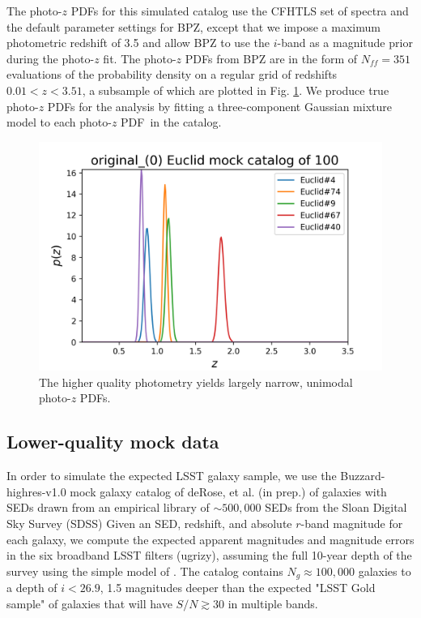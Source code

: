 \documentclass[\docopts]{\docclass}
\newcommand{\pz}{photo-$z$ PDF}
\begin{document}
The \pz s for this simulated catalog use the CFHTLS set of spectra
\citep{ilbert_accurate_2006} and the default parameter settings for BPZ, except
that we impose a maximum photometric redshift of 3.5 and allow BPZ to use the
$i$-band as a magnitude prior during the photo-$z$ fit. The \pz s from BPZ are
in the form of $N_{ff} = 351$ evaluations of the probability density on a
regular grid of redshifts $0.01 < z < 3.51$, a subsample of which are plotted
in Fig. \ref{fig:euclid_pzs}.  We produce true \pz s for the analysis by
fitting a three-component Gaussian mixture model to each \pz\ in the catalog.

\begin{figure}
  \includegraphics[width=0.9\columnwidth]{figures/euclid_pzs.png}
  \caption{The higher quality photometry yields largely narrow, unimodal \pz s.
  \label{fig:euclid_pzs}}
\end{figure}

\subsection{Lower-quality mock data}
\label{sec:LSST}

In order to simulate the expected LSST galaxy sample, we use the
Buzzard-highres-v1.0 mock galaxy catalog of deRose, et al. (in prep.) of
galaxies with SEDs drawn from an empirical library of $\sim500,000$ SEDs from
the Sloan Digital Sky Survey (SDSS)
Given an SED, redshift, and absolute $r$-band magnitude for each galaxy, we
compute the expected apparent magnitudes and magnitude errors in the six
broadband LSST filters (ugrizy), assuming the full 10-year depth of the survey
using the simple model of \citet{ivezic_lsst:_2008}.  The catalog contains
$N_{g}\approx100,000$ galaxies to a depth of $i<26.9$, 1.5 magnitudes deeper
than the expected "LSST Gold sample" of galaxies that will have $S/N\gtrsim30$
in multiple bands.
\end{document}
